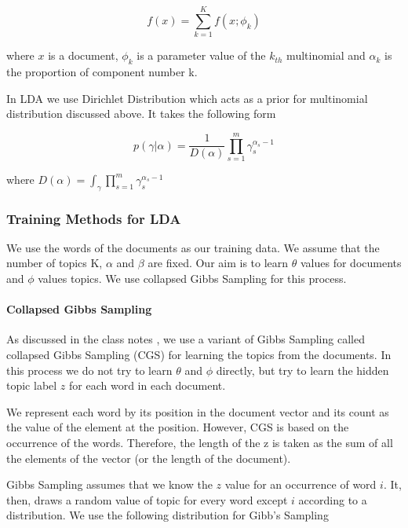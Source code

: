 \documentclass[11pt,a4paper,oneside]{article}
\begin{document}
\begin{equation}
f(x) = \sum^K_{k=1}f(x;\phi_k)
\end{equation}

where $x$ is a document, $\phi_k$ is a parameter value of the $k_{th}$ multinomial and $\alpha_k$ is the proportion of component number k.

In LDA we use Dirichlet Distribution which acts as a prior for multinomial distribution discussed above. It takes the following form \cite{classNotes}

\begin{equation}
p(\gamma|\alpha) = \frac{1}{D(\alpha)}\prod^m_{s=1}\gamma^{\alpha_s - 1}_s
\end{equation}

where ${D(\alpha)} = \int_\gamma \prod^m_{s=1}\gamma^{\alpha_s - 1}_s$

\subsubsection{Training Methods for LDA}

We use the words of the documents as our training data. We assume that the number of topics K, $\alpha$ and $\beta$ are fixed. Our aim is to learn $\theta$ values for documents and $\phi$ values topics. We use collapsed Gibbs Sampling for this process.

\paragraph*{Collapsed Gibbs Sampling}

As discussed in the class notes \cite{classNotes}, we use a variant of Gibbs Sampling called collapsed Gibbs Sampling (CGS) for learning the topics from the documents. In this process we do not try to learn $\theta$ and $\phi$ directly, but try to learn the hidden topic label $z$ for each word in each document.

We represent each word by its position in the document vector and its count as the value of the element at the position. However, CGS is based on the occurrence of the words. Therefore, the length of the z is taken as the sum of all the elements of the vector (or the length of the document).

Gibbs Sampling assumes that we know the $z$ value for an occurrence of word $i$. It, then, draws a random value of topic for every word except $i$ according to a distribution. We use the following distribution for Gibb's Sampling
\end{document}
